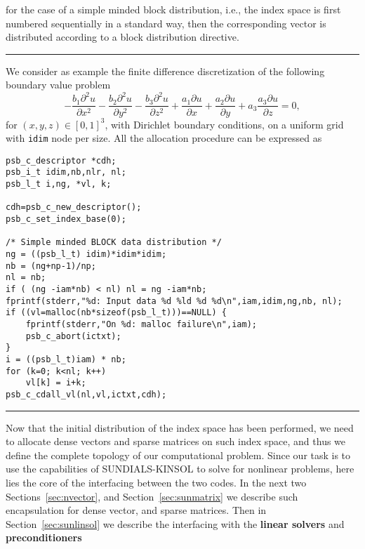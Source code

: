 \documentclass[twoside,a4paper]{refart}
\begin{document}
	for the case of a simple minded block distribution, i.e., the index space is first numbered sequentially in a standard way, then the corresponding vector is distributed according to a block distribution directive. 
	
\noindent\rule{\columnwidth}{0.4pt}
We consider as example the finite difference discretization of the following boundary value problem
\begin{equation}\label{eq:boundaryproblem}
	- \frac{b_1 \partial^2 u}{\partial x^2} - \frac{b_2 \partial^2 u}{\partial y^2} - \frac{b_3 \partial^2 u}{\partial z^2} + \frac{a_1 \partial u}{\partial x} + \frac{a_2 \partial u}{\partial y} + a_3 \frac{a_3 \partial u}{\partial z} = 0, 
\end{equation}
for $(x,y,z) \in [0,1]^3$, with Dirichlet boundary conditions, on a uniform grid with \lstinline[style=CStyle]|idim| node per size. All the allocation procedure can be expressed as
\begin{lstlisting}[style=CStyle,caption="Example of allocation procedure for a 3D block data distribution",label=lst:example_of_allocation]
psb_c_descriptor *cdh;
psb_i_t idim,nb,nlr, nl;
psb_l_t i,ng, *vl, k;

cdh=psb_c_new_descriptor();
psb_c_set_index_base(0);

/* Simple minded BLOCK data distribution */ 
ng = ((psb_l_t) idim)*idim*idim;  
nb = (ng+np-1)/np;
nl = nb;
if ( (ng -iam*nb) < nl) nl = ng -iam*nb; 
fprintf(stderr,"%d: Input data %d %ld %d %d\n",iam,idim,ng,nb, nl);
if ((vl=malloc(nb*sizeof(psb_l_t)))==NULL) {
	fprintf(stderr,"On %d: malloc failure\n",iam);
	psb_c_abort(ictxt);
}
i = ((psb_l_t)iam) * nb;
for (k=0; k<nl; k++)
	vl[k] = i+k; 
psb_c_cdall_vl(nl,vl,ictxt,cdh);
\end{lstlisting}
\noindent\rule{\columnwidth}{0.4pt}	

	Now that the initial distribution of the index space has been performed, we need to allocate  dense vectors and sparse matrices on such index space, and thus we define the complete topology of our computational problem. Since our task is to use the capabilities of SUNDIALS-KINSOL to solve for nonlinear problems, here lies the core of the interfacing between the two codes. In the next two Sections~\ref{sec:nvector}, and Section~\ref{sec:sunmatrix} we describe such encapsulation for dense vector, and sparse matrices. Then in Section~\ref{sec:sunlinsol} we describe the interfacing with the \textbf{linear solvers} and \textbf{preconditioners} 
\end{document}
